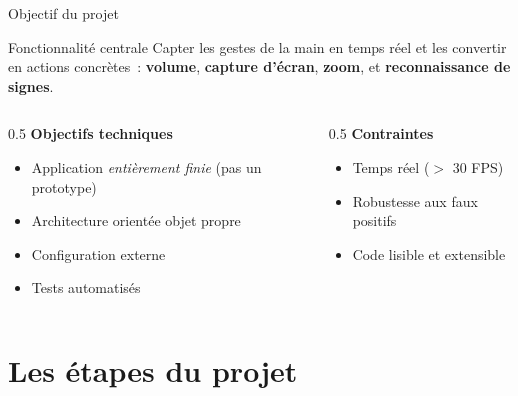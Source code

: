\documentclass[aspectratio=169,12pt]{beamer}
\begin{document}
\begin{frame}{Objectif du projet}
  \begin{block}{Fonctionnalit\'e centrale}
    Capter les gestes de la main en temps r\'eel et les convertir en actions concr\`etes~:
    \textbf{volume}, \textbf{capture d'\'ecran}, \textbf{zoom}, et \textbf{reconnaissance de signes}.
  \end{block}
  \vspace{0.3cm}
  \begin{columns}
    \begin{column}{0.5\textwidth}
      \textbf{Objectifs techniques}
      \begin{itemize}
        \item Application \emph{enti\`erement finie} (pas un prototype)
        \item Architecture orient\'ee objet propre
        \item Configuration externe
        \item Tests automatis\'es
      \end{itemize}
    \end{column}
    \begin{column}{0.5\textwidth}
      \textbf{Contraintes}
      \begin{itemize}
        \item Temps r\'eel ($>$ 30 FPS)
        \item Robustesse aux faux positifs
        \item Code lisible et extensible
      \end{itemize}
    \end{column}
  \end{columns}
\end{frame}

\section{Les \'etapes du projet}
\end{document}

